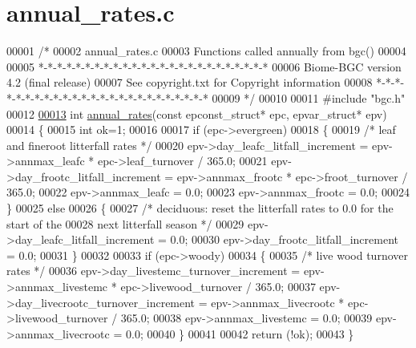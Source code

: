 \hypertarget{annual__rates_8c_source}{}\section{annual\+\_\+rates.\+c}
\label{annual__rates_8c_source}

\begin{DoxyCode}
00001 \textcolor{comment}{/*}
00002 \textcolor{comment}{annual\_rates.c}
00003 \textcolor{comment}{Functions called annually from bgc()}
00004 \textcolor{comment}{}
00005 \textcolor{comment}{*-*-*-*-*-*-*-*-*-*-*-*-*-*-*-*-*-*-*-*-*-*-*-*-*}
00006 \textcolor{comment}{Biome-BGC version 4.2 (final release)}
00007 \textcolor{comment}{See copyright.txt for Copyright information}
00008 \textcolor{comment}{*-*-*-*-*-*-*-*-*-*-*-*-*-*-*-*-*-*-*-*-*-*-*-*-*}
00009 \textcolor{comment}{*/}
00010 
00011 \textcolor{preprocessor}{#include "bgc.h"}
00012 
\hypertarget{annual__rates_8c_source_l00013}{}\hyperlink{annual__rates_8c_a31da74671128c782a97dbd8952ded454}{00013} \textcolor{keywordtype}{int} \hyperlink{annual__rates_8c_a31da74671128c782a97dbd8952ded454}{annual\_rates}(\textcolor{keyword}{const} epconst\_struct* epc, epvar\_struct* epv)
00014 \{
00015     \textcolor{keywordtype}{int} ok=1;
00016     
00017     \textcolor{keywordflow}{if} (epc->evergreen)
00018     \{
00019         \textcolor{comment}{/* leaf and fineroot litterfall rates */}
00020         epv->day\_leafc\_litfall\_increment = epv->annmax\_leafc * epc->leaf\_turnover / 365.0;
00021         epv->day\_frootc\_litfall\_increment = epv->annmax\_frootc * epc->froot\_turnover / 365.0;
00022         epv->annmax\_leafc = 0.0;
00023         epv->annmax\_frootc = 0.0;
00024     \}
00025     \textcolor{keywordflow}{else}
00026     \{
00027         \textcolor{comment}{/* deciduous: reset the litterfall rates to 0.0 for the start of the}
00028 \textcolor{comment}{        next litterfall season */}
00029         epv->day\_leafc\_litfall\_increment = 0.0;
00030         epv->day\_frootc\_litfall\_increment = 0.0;
00031     \}
00032     
00033     \textcolor{keywordflow}{if} (epc->woody)
00034     \{
00035         \textcolor{comment}{/* live wood turnover rates */}
00036         epv->day\_livestemc\_turnover\_increment = epv->annmax\_livestemc * epc->livewood\_turnover / 365.0;
00037         epv->day\_livecrootc\_turnover\_increment = epv->annmax\_livecrootc * epc->livewood\_turnover / 365.0;
00038         epv->annmax\_livestemc = 0.0;
00039         epv->annmax\_livecrootc = 0.0;
00040     \}
00041     
00042     \textcolor{keywordflow}{return} (!ok);
00043 \}
\end{DoxyCode}
